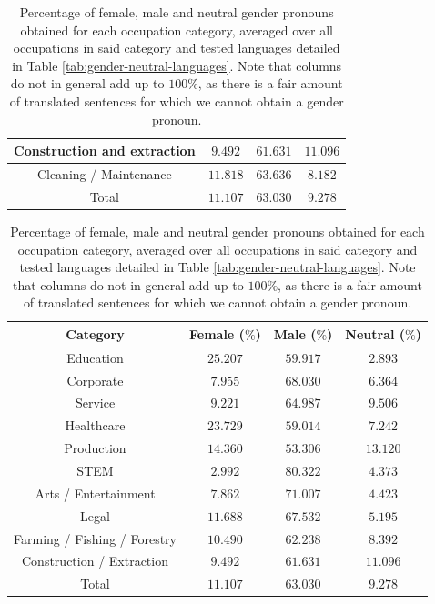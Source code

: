 \documentclass[fleqn,10pt]{article}
\begin{document}
\begin{table}[H]
{\begin{tabular}{|c|c|c|c|}
	Construction and extraction				& $9.492$ 		& $61.631$		& $11.096$		\\ \hline
	Cleaning / Maintenance					& $11.818$		& $63.636$		& $8.182$		\\ \hline
	\hline
	Total           						& $11.107$ 		& $63.030$ 		& $9.278$ 		\\ \hline
	\end{tabular}
	\caption{Percentage of female, male and neutral gender pronouns obtained for each occupation category, averaged over all occupations in said category and tested languages detailed in Table \ref{tab:gender-neutral-languages}. Note that columns do not in general add up to $100\%$, as there is a fair amount of translated sentences for which we cannot obtain a gender pronoun.}
	\label{tab:gender-by-category}
	}
\end{table}

\begin{table}[H]
\small{
	\centering
	\begin{tabular}{|c|c|c|c|}
	\hline
	Category 								& Female ($\%$)			& Male ($\%$)			& Neutral ($\%$)	\\ \hline
	\hline
	Education								& $25.207$				& $59.917$				& $2.893$			\\ \hline
	Corporate								& $7.955$				& $68.030$				& $6.364$			\\ \hline
	Service									& $9.221$				& $64.987$				& $9.506$			\\ \hline
	Healthcare								& $23.729$				& $59.014$				& $7.242$			\\ \hline
	Production								& $14.360$				& $53.306$				& $13.120$			\\ \hline
	STEM									& $2.992$				& $80.322$				& $4.373$			\\ \hline
	Arts / Entertainment					& $7.862$				& $71.007$				& $4.423$			\\ \hline
	Legal									& $11.688$				& $67.532$				& $5.195$			\\ \hline
	Farming / Fishing / Forestry			& $10.490$				& $62.238$				& $8.392$			\\ \hline
	Construction / Extraction				& $9.492$				& $61.631$				& $11.096$			\\ \hline
	\hline
	Total           						& $11.107$ 				& $63.030$ 				& $9.278$ 			\\ \hline
	\end{tabular}
	\caption{Percentage of female, male and neutral gender pronouns obtained for each occupation category, averaged over all occupations in said category and tested languages detailed in Table \ref{tab:gender-neutral-languages}. Note that columns do not in general add up to $100\%$, as there is a fair amount of translated sentences for which we cannot obtain a gender pronoun.}
	\label{tab:gender-by-category-grouped}
	}
\end{table}
\end{document}
